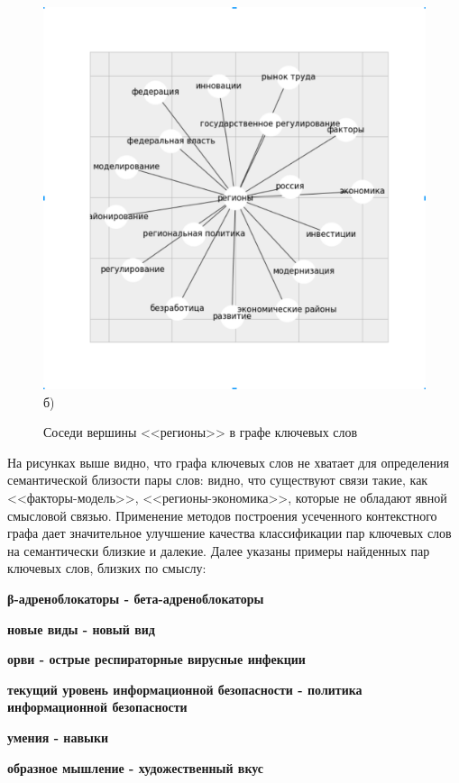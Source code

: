 \begin{figure}[ht]
\begin{minipage}[ht]{0.49\linewidth}
    \includegraphics[width=1.0\linewidth]{Dissertation/pics/regiony_sim} \\ б)
    \caption{Соседи вершины <<регионы>> в графе ключевых слов}
  \end{minipage}
  \label{img:sim_1}
\end{figure}

На рисунках выше видно, что графа ключевых слов не хватает для определения семантической близости пары слов: видно, что существуют связи такие, как <<факторы-модель>>, <<регионы-экономика>>, которые не обладают явной смысловой связью. Применение методов построения усеченного контекстного графа дает значительное улучшение качества классификации пар ключевых слов на семантически близкие и далекие. Далее указаны примеры найденных пар ключевых слов, близких по смыслу:

\textbf{β-адреноблокаторы   -   бета-адреноблокаторы}

\textbf{новые виды   -   новый вид}

\textbf{орви   -   острые респираторные вирусные инфекции}

\textbf{текущий уровень информационной безопасности   - политика информационной безопасности}

\textbf{умения   -   навыки}

\textbf{образное мышление   -   художественный вкус}

